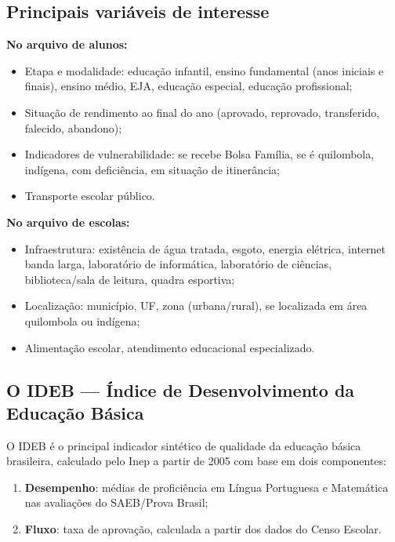 \subsection{Principais variáveis de interesse}

\textbf{No arquivo de alunos:}
\begin{itemize}
  \item Etapa e modalidade: educação infantil, ensino fundamental (anos iniciais e finais), ensino médio, EJA, educação especial, educação profissional;
  \item Situação de rendimento ao final do ano (aprovado, reprovado, transferido, falecido, abandono);
  \item Indicadores de vulnerabilidade: se recebe Bolsa Família, se é quilombola, indígena, com deficiência, em situação de itinerância;
  \item Transporte escolar público.
\end{itemize}

\textbf{No arquivo de escolas:}
\begin{itemize}
  \item Infraestrutura: existência de água tratada, esgoto, energia elétrica, internet banda larga, laboratório de informática, laboratório de ciências, biblioteca/sala de leitura, quadra esportiva;
  \item Localização: município, UF, zona (urbana/rural), se localizada em área quilombola ou indígena;
  \item Alimentação escolar, atendimento educacional especializado.
\end{itemize}

\subsection{O IDEB — Índice de Desenvolvimento da Educação Básica}

O IDEB é o principal indicador sintético de qualidade da educação básica brasileira, calculado pelo Inep a partir de 2005 com base em dois componentes:

\begin{enumerate}
  \item \textbf{Desempenho}: médias de proficiência em Língua Portuguesa e Matemática nas avaliações do SAEB/Prova Brasil;
  \item \textbf{Fluxo}: taxa de aprovação, calculada a partir dos dados do Censo Escolar.
\end{enumerate}

